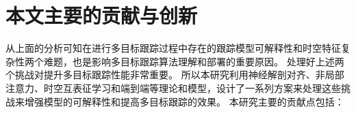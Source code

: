 %
%
%
%
%
%
%
%
%
%



\section{本文主要的贡献与创新}
从上面的分析可知在进行多目标跟踪过程中存在的跟踪模型可解释性和时空特征复杂性两个难题，也是影响多目标跟踪算法理解和部署的重要原因。
处理好上述两个挑战对提升多目标跟踪性能非常重要。
所以本研究利用神经解剖对齐、非局部注意力、时空互表征学习和端到端等理论和模型，设计了一系列方案来处理这些挑战来增强模型的可解释性和提高多目标跟踪的效果。
本研究主要的贡献点包括：

